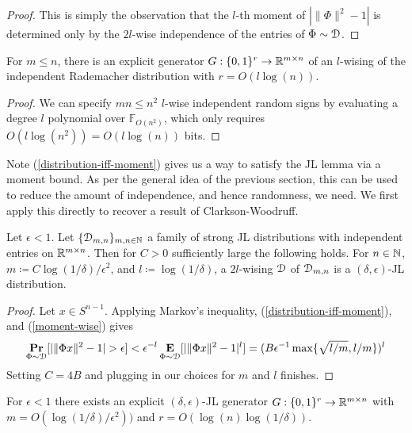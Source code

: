 \begin{proof}
  This is simply the observation that the $l$-th moment of
  $|\|\Phi\|^2 - 1|$ is determined only by the $2l$-wise independence
  of the entries of $\Phi \sim \mathcal{D}$.
\end{proof}

\begin{lemma}
  \label{lwise-gen}
  For $m \le n$, there is an explicit generator $G : \{0,1\}^r \to
  \mathbb{R}^{m \times n}$ of an $l$-wising of the independent Rademacher
  distribution with $r = O(l \log(n))$.
\end{lemma}

\begin{proof}
  We can specify $mn \le n^2$ $l$-wise independent random signs by
  evaluating a degree $l$ polynomial over $\mathbb{F}_{O(n^2)}$, which
  only requires $O(l \log(n^2)) = O(l \log(n))$ bits.
\end{proof}

Note (\ref{distribution-iff-moment}) gives us a way to satisfy the JL
lemma via a moment bound. As per the general idea of the previous
section, this can be used to reduce the amount of independence, and
hence randomness, we need. We first apply this directly to recover a
result of Clarkson-Woodruff.

\begin{proposition}
  \label{oneshot}
  Let $\epsilon < 1$. Let $\{\mathcal{D}_{m,n}\}_{m,n \in \mathbb{N}}$ a family of
  strong JL distributions with independent entries on $\mathbb{R}^{m \times
    n}$. Then for $C > 0$ sufficiently large the following holds. For
  $n \in \mathbb{N}$, $m \coloneqq C\log(1/\delta)/\epsilon^2$, and $l
  \coloneqq \log(1/\delta)$, a $2l$-wising $\mathcal{D}$ of $\mathcal{D}_{m,n}$ is a
  $(\delta,\epsilon)$-JL distribution.
\end{proposition}

\begin{proof}
  Let $x \in S^{n-1}$. Applying Markov's inequality,
  (\ref{distribution-iff-moment}), and (\ref{moment-wise}) gives
  \begin{equation}
    \label{moment-bound}
    \operatorname*{\mathbf{Pr}}_{\Phi \sim \mathcal{D}} [|\|\Phi x\|^2 - 1| > \epsilon] < \epsilon^{-l}
    \operatorname*{\mathbf{E}}_{\Phi \sim \mathcal{D}} [|\|\Phi x\|^2 - 1|^l] =
    (B\epsilon^{-1}\max\{\sqrt{l/m}, l/m\})^l
  \end{equation}
  Setting $C = 4B$ and plugging in our choices for $m$ and $l$
  finishes.
\end{proof}

\begin{theorem}
  \label{cwcomplex}
  For $\epsilon < 1$ there exists an explicit $(\delta,\epsilon)$-JL
  generator $G : \{0,1\}^r \to \mathbb{R}^{m \times n}$ with $m =
  O(\log(1/\delta)/\epsilon^2))$ and $r = O(\log(n)\log(1/\delta))$.
\end{theorem}


